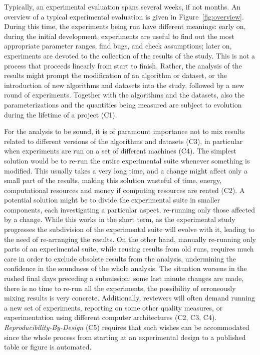 \documentclass{llncs}
\begin{document}
Typically, an experimental evaluation spans several weeks, if not months. An overview of a typical experimental evaluation is given in Figure~\ref{fig:overview}. 
During this time, the experiments being run have different meanings: early
on, during the initial development, experiments are useful to find out the most
appropriate parameter ranges, find bugs, and check assumptions; later on,
experiments are devoted to the collection of the results of the study.
This is not a process that proceeds linearly from start to finish. 
Rather, the analysis of the results might prompt the modification of an algorithm
or dataset, or the introduction of new algorithms and datasets into the study,
followed by a new round of experiments.
Together with the algorithms and the datasets, also the parameterizations and the
quantities being measured are subject to evolution during the lifetime of a project (C1).

For the analysis to be sound, it is of paramount importance not to 
mix results related to different versions
of the algorithms and datasets (C3), in particular when experiments are run on a set of different machines (C4). 
The simplest solution would be to re-run the entire experimental suite whenever
something is modified. 
This usually takes a very long time, and a change might affect 
only a small part of the results, making this solution wasteful of time, energy, computational resources and money if computing resources are rented (C2). 
A potential solution might be to divide the experimental suite in smaller
components, each investigating a particular aspect, re-running only those 
affected by a change.
While this works in the short term, as the experimental study progresses
the subdivision of the experimental suite will evolve with it, leading to the
need of re-arranging the results.
On the other hand, manually re-running only parts of an experimental suite,
while reusing results from old runs, requires much care in order to exclude
obsolete results from the analysis, undermining the confidence in the soundness
of the whole analysis.
The situation worsens in the rushed final days preceding a submission:
some last minute changes are made, there is no time to re-run all the experiments,
the possibility of erroneously mixing results is very concrete. Additionally, reviewers will often demand running a new set of experiments, reporting on some other quality measures, or experimentation using different computer architectures (C2, C3, C4). \emph{Reproducibility-By-Design} (C5) requires that such wishes can be accommodated since the whole process from starting at an experimental design to a published table or figure is automated.
\end{document}

